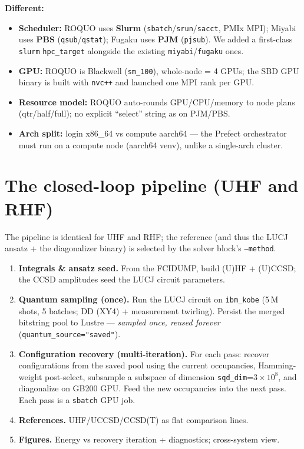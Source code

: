 \documentclass[11pt]{article}
\begin{document}
\textbf{Different:}
\begin{itemize}
  \item \textbf{Scheduler:} ROQUO uses \textbf{Slurm} (\texttt{sbatch}/\texttt{srun}/\texttt{sacct},
        PMIx MPI); Miyabi uses \textbf{PBS} (\texttt{qsub}/\texttt{qstat}); Fugaku uses \textbf{PJM}
        (\texttt{pjsub}). We added a first-class \texttt{slurm} \texttt{hpc\_target} alongside the
        existing \texttt{miyabi}/\texttt{fugaku} ones.
  \item \textbf{GPU:} ROQUO is Blackwell (\texttt{sm\_100}), whole-node = 4 GPUs; the SBD GPU
        binary is built with \texttt{nvc++} and launched one MPI rank per GPU.
  \item \textbf{Resource model:} ROQUO auto-rounds GPU/CPU/memory to node plans (qtr/half/full);
        no explicit ``select'' string as on PJM/PBS.
  \item \textbf{Arch split:} login x86\_64 vs compute aarch64 --- the Prefect orchestrator must run
        on a compute node (aarch64 venv), unlike a single-arch cluster.
\end{itemize}

\section{The closed-loop pipeline (UHF and RHF)}
The pipeline is identical for UHF and RHF; the reference (and thus the LUCJ ansatz + the
diagonalizer binary) is selected by the solver block's \texttt{--method}.

\begin{enumerate}
  \item \textbf{Integrals \& ansatz seed.} From the FCIDUMP, build (U)HF + (U)CCSD; the CCSD
        amplitudes seed the LUCJ circuit parameters.
  \item \textbf{Quantum sampling (once).} Run the LUCJ circuit on \texttt{ibm\_kobe} (5\,M shots,
        5 batches; DD (XY4) + measurement twirling). Persist the merged bitstring pool to Lustre
        --- \emph{sampled once, reused forever} (\texttt{quantum\_source="saved"}).
  \item \textbf{Configuration recovery (multi-iteration).} For each pass: recover configurations
        from the saved pool using the current occupancies, Hamming-weight post-select, subsample a
        subspace of dimension \texttt{sqd\_dim}=$3\times10^8$, and diagonalize on GB200 GPU. Feed
        the new occupancies into the next pass. Each pass is a \texttt{sbatch} GPU job.
  \item \textbf{References.} UHF/UCCSD/CCSD(T) as flat comparison lines.
  \item \textbf{Figures.} Energy vs recovery iteration + diagnostics; cross-system view.
\end{enumerate}
\end{document}
